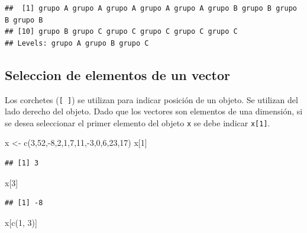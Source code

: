 \documentclass[
]{book}
\newenvironment{Shaded}{\begin{snugshade}}{\end{snugshade}}
\newcommand{\DecValTok}[1]{\textcolor[rgb]{0.00,0.00,0.81}{#1}}
\newcommand{\FunctionTok}[1]{\textcolor[rgb]{0.00,0.00,0.00}{#1}}
\newcommand{\NormalTok}[1]{#1}
\newcommand{\OtherTok}[1]{\textcolor[rgb]{0.56,0.35,0.01}{#1}}
\newcommand{\SpecialCharTok}[1]{\textcolor[rgb]{0.00,0.00,0.00}{#1}}
\begin{document}
\begin{verbatim}
##  [1] grupo A grupo A grupo A grupo A grupo A grupo B grupo B grupo B grupo B
## [10] grupo B grupo C grupo C grupo C grupo C grupo C
## Levels: grupo A grupo B grupo C
\end{verbatim}

\hypertarget{seleccion-de-elementos-de-un-vector}{%
\subsection{Seleccion de elementos de un vector}\label{seleccion-de-elementos-de-un-vector}}

Los corchetes (\texttt{{[}\ {]}}) se utilizan para indicar posición de un objeto. Se utilizan del lado derecho del objeto. Dado que los vectores son elementos de una dimensión, si se desea seleccionar el primer elemento del objeto \texttt{x} se debe indicar \texttt{x{[}1{]}}.

\begin{Shaded}
\begin{Highlighting}[]
\NormalTok{x }\OtherTok{\textless{}{-}} \FunctionTok{c}\NormalTok{(}\DecValTok{3}\NormalTok{,}\DecValTok{52}\NormalTok{,}\SpecialCharTok{{-}}\DecValTok{8}\NormalTok{,}\DecValTok{2}\NormalTok{,}\DecValTok{1}\NormalTok{,}\DecValTok{7}\NormalTok{,}\DecValTok{11}\NormalTok{,}\SpecialCharTok{{-}}\DecValTok{3}\NormalTok{,}\DecValTok{0}\NormalTok{,}\DecValTok{6}\NormalTok{,}\DecValTok{23}\NormalTok{,}\DecValTok{17}\NormalTok{)}
\NormalTok{x[}\DecValTok{1}\NormalTok{]}
\end{Highlighting}
\end{Shaded}

\begin{verbatim}
## [1] 3
\end{verbatim}

\begin{Shaded}
\begin{Highlighting}[]
\NormalTok{x[}\DecValTok{3}\NormalTok{]}
\end{Highlighting}
\end{Shaded}

\begin{verbatim}
## [1] -8
\end{verbatim}

\begin{Shaded}
\begin{Highlighting}[]
\NormalTok{x[}\FunctionTok{c}\NormalTok{(}\DecValTok{1}\NormalTok{, }\DecValTok{3}\NormalTok{)]}
\end{Highlighting}
\end{Shaded}
\end{document}

